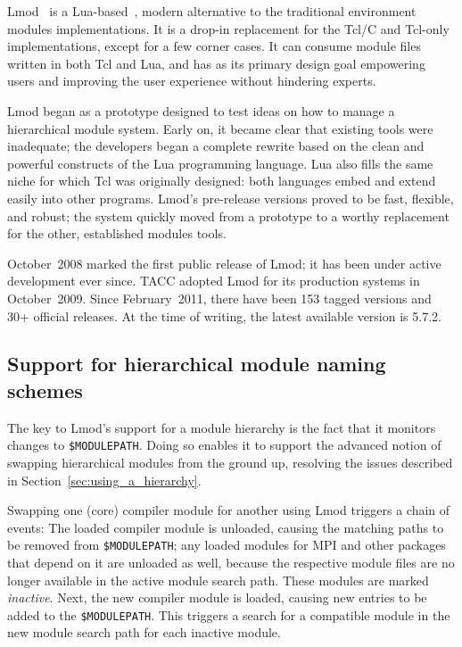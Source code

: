 Lmod~\cite{laytonLmod,taccSecretSauce,taccLmod} is a Lua-based~\cite{LuaBook},
modern alternative to the traditional environment modules implementations.
It is a drop-in replacement for the Tcl/C
and Tcl-only implementations, except for a few corner cases.
It can consume module files written in both Tcl and
Lua, and has as its primary design goal empowering users 
and improving the user experience without hindering experts.

Lmod began as a prototype designed to test ideas on how to manage a hierarchical
module system.  Early on, it became clear that existing tools were inadequate; 
the developers began a complete rewrite based on the clean
and powerful constructs of the Lua programming language.
Lua also fills the same niche for which Tcl was
originally designed: both languages embed and extend easily into
other programs.  Lmod's pre-release versions proved to be
fast, flexible, and robust; the system quickly moved from
a prototype to a worthy replacement for the other, established modules tools.

October~2008 marked the first public release of Lmod; it has been under active
development ever since. TACC adopted Lmod for its production systems in October~2009.
Since February~2011, there have been 153 tagged versions and 30+ official releases.
At the time of writing, the latest available version is 5.7.2. 

\subsection{Support for hierarchical module naming schemes}

The key to Lmod's support for a module hierarchy is the fact that it monitors
changes to \texttt{\small \$MODULEPATH}. Doing so enables it to support the
advanced notion of swapping hierarchical modules from the ground up, resolving
the issues described in Section~\ref{sec:using_a_hierarchy}.

Swapping one (core) compiler module for another using Lmod triggers
a chain of events:  The loaded compiler module is unloaded, 
causing the matching paths to be removed from \texttt{\small \$MODULEPATH}; 
 any loaded modules for MPI and other packages that depend on it
are unloaded as well, because the respective module files are no longer available
in the active module search path. These modules are marked \emph{inactive}.
Next, the new compiler module is loaded, causing new entries
to be added to the \texttt{\small \$MODULEPATH}. This triggers a search
for a compatible module in the new module search path for each inactive module.

